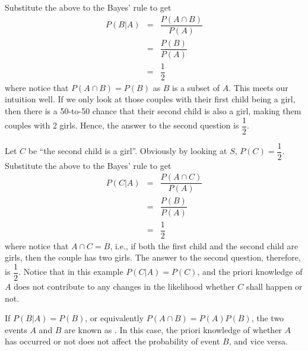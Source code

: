 Substitute the above to the Bayes' rule to get
\begin{eqnarray}
P(B|A) &=& \dfrac{P\left(A \cap B\right)}{P(A)} \nonumber \\
&=& \dfrac{P(B)}{P(A)} \nonumber \\
&=& \dfrac{1}{2} \nonumber
\end{eqnarray}
where notice that $P\left(A \cap B\right) = P(B)$ as $B$ is a subset of $A$. This meets our intuition well. If we only look at those couples with their first child being a girl, then there is a 50-to-50 chance that their second child is also a girl, making them couples with 2 girls. Hence, the answer to the second question is $\dfrac{1}{2}$.

Let $C$ be ``the second child is a girl''. Obviously by looking at $S$, $P(C)=\dfrac{1}{2}$. Substitute the above to the Bayes' rule to get
\begin{eqnarray}
P(C|A) &=& \dfrac{P\left(A \cap C\right)}{P(A)} \nonumber \\
&=& \dfrac{P(B)}{P(A)} \nonumber \\
&=& \dfrac{1}{2} \nonumber
\end{eqnarray}
where notice that $A \cap C = B$, i.e., if both the first child and the second child are girls, then the couple has two girls. The answer to the second question, therefore, is $\dfrac{1}{2}$. Notice that in this example $P(C|A)=P(C)$, and the priori knowledge of $A$ does not contribute to any changes in the likelihood whether $C$ shall happen or not.

If $P(B|A)=P(B)$, or equivalently $P(A\cap B) = P(A)P(B)$, the two events $A$ and $B$ are known as . In this case, the priori knowledge of whether $A$ has occurred or not does not affect the probability of event $B$, and vice versa.
